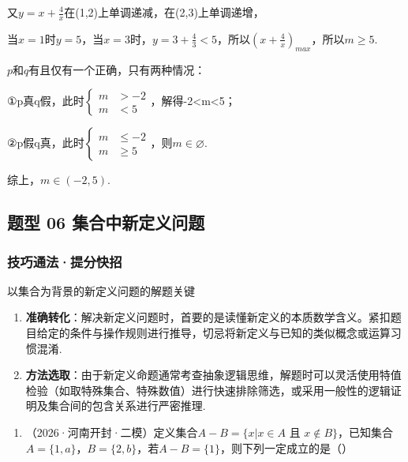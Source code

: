 \documentclass[11pt,a4paper]{ctexart}
\begin{document}
又\(y = x + \frac{4}{x}\)在(1,2)上单调递减，在(2,3)上单调递增，

当\(x = 1\)时\(y = 5\)，当\(x = 3\)时，\(y = 3 + \frac{4}{3} < 5\)，所以\(\left(x + \frac{4}{x}\right)_{max}\)，所以\(m \geq 5\).

\(p\)和\(q\)有且仅有一个正确，只有两种情况：

①p真q假，此时\(\left\{\begin{aligned}m&>-2\\ m&<5\end{aligned}\right.\)，解得-2\textless m\textless5；

②p假q真，此时\(\left\{\begin{aligned}m&\leq-2\\ m&\geq5\end{aligned}\right.\)，则\(m\in\varnothing\).

综上，\(m \in (-2,5)\).\subsection{题型 06
集合中新定义问题}\label{ux9898ux578b-06-ux96c6ux5408ux4e2dux65b0ux5b9aux4e49ux95eeux9898}

\subsubsection{技巧通法·提分快招}\label{ux6280ux5de7ux901aux6cd5ux63d0ux5206ux5febux62db-5}

\begin{methodbox}{以集合为背景的新定义问题的解题关键}

\begin{enumerate}[label=(\arabic*), leftmargin=*]
    \item \textbf{准确转化}：解决新定义问题时，首要的是读懂新定义的本质数学含义。紧扣题目给定的条件与操作规则进行推导，切忌将新定义与已知的类似概念或运算习惯混淆.
    \item \textbf{方法选取}：由于新定义命题通常考查抽象逻辑思维，解题时可以灵活使用特值检验（如取特殊集合、特殊数值）进行快速排除筛选，或采用一般性的逻辑证明及集合间的包含关系进行严密推理.
  \end{enumerate}
\end{methodbox}

\begin{enumerate}[label=\arabic*., leftmargin=*]
\item （2026·河南开封·二模）定义集合\(A - B = \{x | x \in A \text{ 且 } x \notin B\}\)，已知集合\(A = \{1, a\}\)，\(B = \{2, b\}\)，若\(A - B = \{1\}\)，则下列一定成立的是（）
\end{enumerate}
\end{document}

